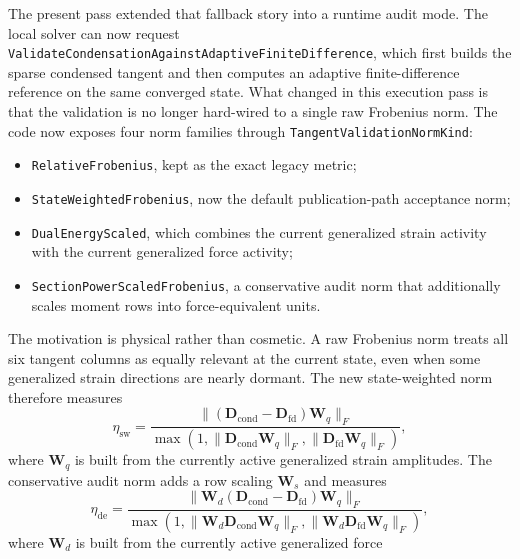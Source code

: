 The present pass extended that fallback story into a runtime audit mode.  The
local solver can now request
\texttt{ValidateCondensationAgainstAdaptiveFiniteDifference}, which first
builds the sparse condensed tangent and then computes an adaptive
finite-difference reference on the same converged state.  What changed in this
execution pass is that the validation is no longer hard-wired to a single raw
Frobenius norm.  The code now exposes four norm families through
\texttt{TangentValidationNormKind}:
\begin{itemize}
  \item \texttt{RelativeFrobenius}, kept as the exact legacy metric;
  \item \texttt{StateWeightedFrobenius}, now the default publication-path
    acceptance norm;
  \item \texttt{DualEnergyScaled}, which combines the current generalized
    strain activity with the current generalized force activity;
  \item \texttt{SectionPowerScaledFrobenius}, a conservative audit norm that
    additionally scales moment rows into force-equivalent units.
\end{itemize}
The motivation is physical rather than cosmetic.  A raw Frobenius norm treats
all six tangent columns as equally relevant at the current state, even when
some generalized strain directions are nearly dormant.  The new state-weighted
norm therefore measures
\begin{equation}
  \eta_{\mathrm{sw}}
  =
  \frac{\lVert
      (\mathbf{D}_{\mathrm{cond}}-\mathbf{D}_{\mathrm{fd}})\mathbf{W}_q
    \rVert_F}
       {\max\!\left(
          1,
          \lVert \mathbf{D}_{\mathrm{cond}}\mathbf{W}_q \rVert_F,
          \lVert \mathbf{D}_{\mathrm{fd}}\mathbf{W}_q \rVert_F
       \right)},
\end{equation}
where \(\mathbf{W}_q\) is built from the currently active generalized strain
amplitudes.  The conservative audit norm adds a row scaling
\(\mathbf{W}_s\) and measures
\begin{equation}
  \eta_{\mathrm{de}}
  =
  \frac{\lVert
      \mathbf{W}_d(\mathbf{D}_{\mathrm{cond}}-\mathbf{D}_{\mathrm{fd}})
      \mathbf{W}_q
    \rVert_F}
       {\max\!\left(
          1,
          \lVert \mathbf{W}_d \mathbf{D}_{\mathrm{cond}}\mathbf{W}_q \rVert_F,
          \lVert \mathbf{W}_d \mathbf{D}_{\mathrm{fd}}\mathbf{W}_q \rVert_F
       \right)},
\end{equation}
where \(\mathbf{W}_d\) is built from the currently active generalized force
